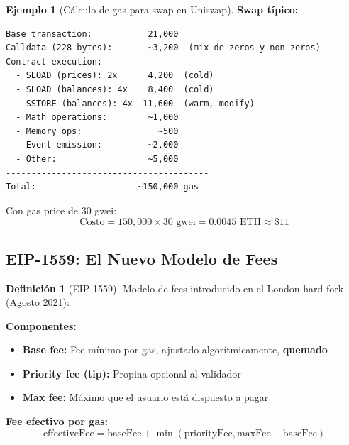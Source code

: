 \documentclass[11pt,a4paper,twoside,openright]{book}
\theoremstyle{definition}
\newtheorem{definition}{Definición}[chapter]
\newtheorem{example}{Ejemplo}[chapter]
\theoremstyle{plain}
\theoremstyle{remark}
\begin{document}
\begin{example}[Cálculo de gas para swap en Uniswap]
\textbf{Swap típico:}
\begin{verbatim}
Base transaction:           21,000
Calldata (228 bytes):       ~3,200  (mix de zeros y non-zeros)
Contract execution:
  - SLOAD (prices): 2x      4,200  (cold)
  - SLOAD (balances): 4x    8,400  (cold)
  - SSTORE (balances): 4x  11,600  (warm, modify)
  - Math operations:        ~1,000
  - Memory ops:               ~500
  - Event emission:         ~2,000
  - Other:                  ~5,000
----------------------------------------
Total:                    ~150,000 gas
\end{verbatim}

Con gas price de 30 gwei:
\[ \text{Costo} = 150,000 \times 30 \text{ gwei} = 0.0045 \text{ ETH} \approx \$11 \]
\end{example}

\subsection{EIP-1559: El Nuevo Modelo de Fees}

\begin{definition}[EIP-1559]
Modelo de fees introducido en el London hard fork (Agosto 2021):

\textbf{Componentes:}
\begin{itemize}
    \item \textbf{Base fee:} Fee mínimo por gas, ajustado algorítmicamente, \textbf{quemado}
    \item \textbf{Priority fee (tip):} Propina opcional al validador
    \item \textbf{Max fee:} Máximo que el usuario está dispuesto a pagar
\end{itemize}

\textbf{Fee efectivo por gas:}
\[ \text{effectiveFee} = \text{baseFee} + \min(\text{priorityFee}, \text{maxFee} - \text{baseFee}) \]
\end{definition}
\end{document}
